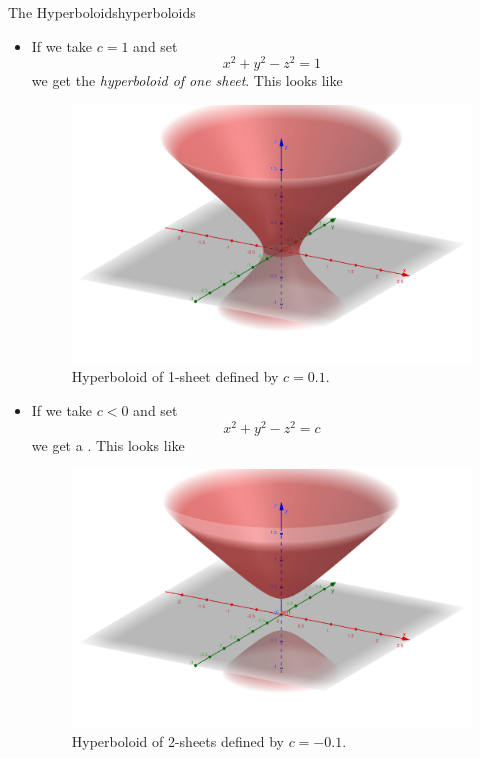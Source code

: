 \begin{ex}{The Hyperboloids}{hyperboloids}
\begin{itemize}
                    \item If we take $c=1$ and set
                    \[
                    x^2+y^2-z^2=1
                    \]
                    we get the \emph{hyperboloid of one sheet}.  This looks like
                    \begin{figure}[H]
                        \centering
                        \includegraphics[width=.8\textwidth]{Figures_Part_6/hyperboloid_1_sheet.png}
                        \caption{Hyperboloid of 1-sheet defined by $c=0.1$.}
                    \end{figure}
                    
                    \item If we take $c<0$ and set
                    \[
                    x^2+y^2-z^2=c
                    \]
                    we get a .  This looks like
                    \begin{figure}[H]
                        \centering
                        \includegraphics[width=.8\textwidth]{Figures_Part_6/hyperboloid_2_sheet.png}
                        \caption{Hyperboloid of 2-sheets defined by $c=-0.1$.}
                    \end{figure}
                \end{itemize}
                \end{ex}
                

